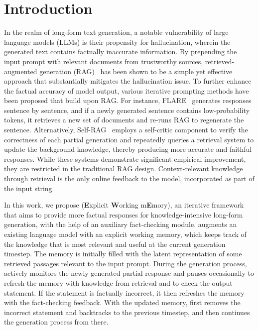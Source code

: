 \section{Introduction}
\label{sec:intro}


In the realm of long-form text generation, a notable vulnerability of large language models (LLMs) is their propensity for hallucination, wherein the generated text contains factually inaccurate information.
By prepending the input prompt with relevant documents from trustworthy sources, retrieved-augmented generation (RAG)~\citep{lewis-etal-2021-rag,shi-etal-2024-replug} has been shown to be a simple yet effective approach that substantially mitigates the hallucination issue.
To further enhance the factual accuracy of model output, various iterative prompting methods have been proposed that build upon RAG. For instance, FLARE~\citep{jiang-etal-2023-active} generates responses sentence by sentence, and if a newly generated sentence contains low-probability tokens, it retrieves a new set of documents and re-runs RAG to regenerate the sentence. Alternatively, Self-RAG~\citep{asai2024selfrag} employs a self-critic component to verify the correctness of each partial generation and repeatedly queries a retrieval system to update the background knowledge, thereby producing more accurate and faithful responses.
While these systems demonstrate significant empirical improvement, they are restricted in the traditional RAG design. Context-relevant knowledge through retrieval is the only online feedback to the model, incorporated as part of the input string. 



In this work, we propose \model (\textbf{E}xplicit \textbf{W}orking m\textbf{E}mory), an iterative framework that aims to provide more factual responses for knowledge-intensive long-form generation, with the help of an auxiliary fact-checking module. \model augments an existing language model with an explicit working memory, which keeps track of the knowledge that is most relevant and useful at the current generation timestep. The memory is initially filled with the latent representation of some retrieved passages relevant to the input prompt. During the generation process, \model actively monitors the newly generated partial response and pauses occasionally to refresh the memory with knowledge from retrieval and to 
check the output statement. If the statement is factually incorrect, it then refreshes the memory with the fact-checking feedback. With the updated memory, \model first removes the incorrect statement and backtracks to the previous timestep, and then continues the generation process from there. 

